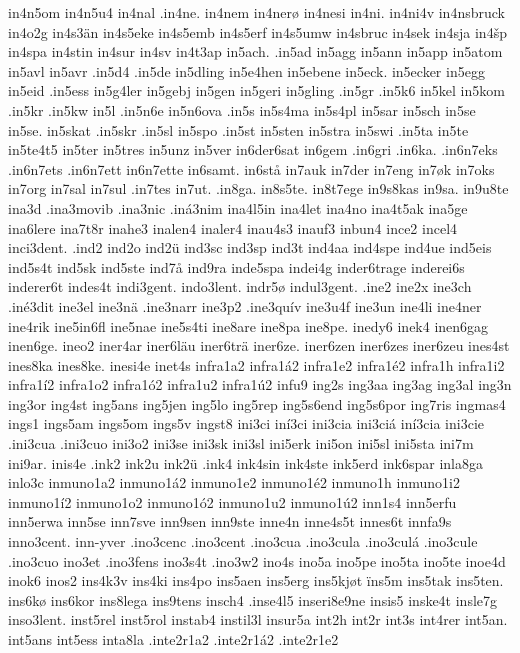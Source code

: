 {{in4n5om
in4n5u4
in4nal
.in4ne.
in4nem
in4nerø
in4nesi
in4ni.
in4ni4v
in4nsbruck
in4o2g
in4s3än
in4s5eke
in4s5emb
in4s5erf
in4s5umw
in4sbruc
in4sek
in4sja
in4šp
in4spa
in4stin
in4sur
in4sv
in4t3ap
in5ach.
.in5ad
in5agg
in5ann
in5app
in5atom
in5avl
in5avr
.in5d4
.in5de
in5dling
in5e4hen
in5ebene
in5eck.
in5ecker
in5egg
in5eid
.in5ess
in5g4ler
in5gebj
in5gen
in5geri
in5gling
.in5gr
.in5k6
in5kel
in5kom
.in5kr
.in5kw
in5l
.in5n6e
in5n6ova
.in5s
in5s4ma
in5s4pl
in5sar
in5sch
in5se
in5se.
in5skat
.in5skr
.in5sl
in5spo
.in5st
in5sten
in5stra
in5swi
.in5ta
in5te
in5te4t5
in5ter
in5tres
in5unz
in5ver
in6der6sat
in6gem
.in6gri
.in6ka.
.in6n7eks
.in6n7ets
.in6n7ett
in6n7ette
in6samt.
in6stå
in7auk
in7der
in7eng
in7øk
in7oks
in7org
in7sal
in7sul
.in7tes
in7ut.
.in8ga.
in8s5te.
in8t7ege
in9s8kas
in9sa.
in9u8te
ina3d
.ina3movib
.ina3nic
.iná3nim
ina4l5in
ina4let
ina4no
ina4t5ak
ina5ge
ina6lere
ina7t8r
inahe3
inalen4
inaler4
inau4s3
inauf3
inbun4
ince2
incel4
inci3dent.
.ind2
ind2o
ind2ü
ind3sc
ind3sp
ind3t
ind4aa
ind4spe
ind4ue
ind5eis
ind5s4t
ind5sk
ind5ste
ind7å
ind9ra
inde5spa
indei4g
inder6trage
inderei6s
inderer6t
indes4t
indi3gent.
indo3lent.
indr5ø
indul3gent.
.ine2
ine2x
ine3ch
.iné3dit
ine3el
ine3nä
.ine3narr
ine3p2
.ine3quív
ine3u4f
ine3un
ine4li
ine4ner
ine4rik
ine5in6fl
ine5nae
ine5s4ti
ine8are
ine8pa
ine8pe.
inedy6
inek4
inen6gag
inen6ge.
ineo2
iner4ar
iner6läu
iner6trä
iner6ze.
iner6zen
iner6zes
iner6zeu
ines4st
ines8ka
ines8ke.
inesi4e
inet4s
infra1a2
infra1á2
infra1e2
infra1é2
infra1h
infra1i2
infra1í2
infra1o2
infra1ó2
infra1u2
infra1ú2
infu9
ing2s
ing3aa
ing3ag
ing3al
ing3n
ing3or
ing4st
ing5ans
ing5jen
ing5lo
ing5rep
ing5s6end
ing5s6por
ing7ris
ingmas4
ings1
ings5am
ings5om
ings5v
ingst8
ini3ci
iní3ci
ini3cia
ini3ciá
iní3cia
ini3cie
.ini3cua
.ini3cuo
ini3o2
ini3se
ini3sk
ini3sl
ini5erk
ini5on
ini5sl
ini5sta
ini7m
ini9ar.
inis4e
.ink2
ink2u
ink2ü
.ink4
ink4sin
ink4ste
ink5erd
ink6spar
inla8ga
inlo3c
inmuno1a2
inmuno1á2
inmuno1e2
inmuno1é2
inmuno1h
inmuno1i2
inmuno1í2
inmuno1o2
inmuno1ó2
inmuno1u2
inmuno1ú2
inn1s4
inn5erfu
inn5erwa
inn5se
inn7sve
inn9sen
inn9ste
inne4n
inne4s5t
innes6t
innfa9s
inno3cent.
inn-yver
.ino3cenc
.ino3cent
.ino3cua
.ino3cula
.ino3culá
.ino3cule
.ino3cuo
ino3et
.ino3fens
ino3s4t
.ino3w2
ino4s
ino5a
ino5pe
ino5ta
ino5te
inoe4d
inok6
inos2
ins4k3v
ins4ki
ins4po
ins5aen
ins5erg
ins5kjøt
ïns5m
ins5tak
ins5ten.
ins6kø
ins6kor
ins8lega
ins9tens
insch4
.inse4l5
inseri8e9ne
insis5
inske4t
insle7g
inso3lent.
inst5rel
inst5rol
instab4
instil3l
insur5a
int2h
int2r
int3s
int4rer
int5an.
int5ans
int5ess
inta8la
.inte2r1a2
.inte2r1á2
.inte2r1e2
}}
